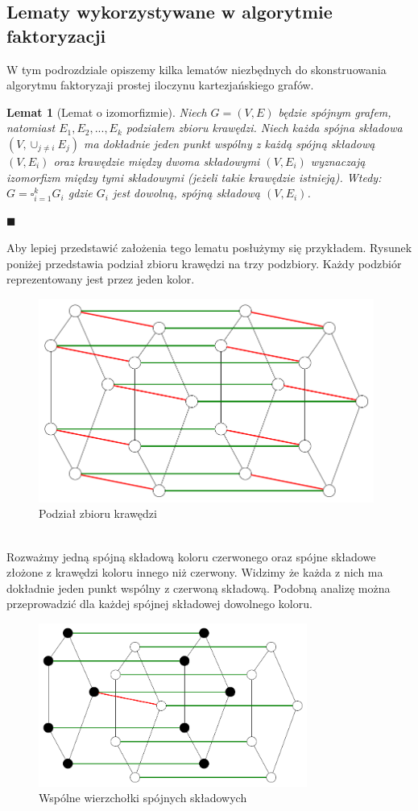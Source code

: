 \documentclass[12pt,a4paper,titlepage]{article}
\newtheorem{lem}[twr]{Lemat}
\newcommand\tab[1][1cm]{\hspace*{#1}}
\begin{document}
\subsection{Lematy wykorzystywane w algorytmie faktoryzacji}
W tym podrozdziale opiszemy kilka lematów niezbędnych do skonstruowania algorytmu faktoryzaji prostej iloczynu kartezjańskiego grafów.
\begin{lem}[Lemat o izomorfizmie]
Niech $G=(V, E)$ będzie spójnym grafem, natomiast $E_1 , E_2 , ... , E_k$ podziałem zbioru krawędzi. Niech każda spójna składowa $(V, \cup_{j \neq i}E_j)$ ma dokładnie jeden punkt wspólny z każdą spójną składową $(V, E_i)$ oraz krawędzie między dwoma składowymi $(V, E_i)$ wyznaczają izomorfizm między tymi składowymi (jeżeli takie krawędzie istnieją). Wtedy: $G=\square_{i=1}^k G_i $ gdzie $G_i $ jest dowolną, spójną składową $(V, E_i)$.
\end{lem}
\begin{flushright}
$\blacksquare$
\end{flushright}
\tab[0.6cm]Aby lepiej przedstawić założenia tego lematu posłużymy się przykładem. Rysunek poniżej przedstawia podział zbioru krawędzi na trzy podzbiory. Każdy podzbiór reprezentowany jest przez jeden kolor.
\begin{figure}[h]
\centering
\includegraphics[width = 11cm]{graf1.png}
\caption{Podział zbioru krawędzi}
\end{figure}
\\
\tab[0.6cm]Rozważmy jedną spójną składową koloru czerwonego oraz spójne składowe złożone z krawędzi koloru innego niż czerwony. Widzimy że każda z nich ma dokładnie jeden punkt wspólny z czerwoną składową. Podobną analizę można przeprowadzić dla każdej spójnej składowej dowolnego koloru.\\
\begin{figure}[h]
\centering
\includegraphics[width = 8.8cm]{izom1.png}
\caption{Wspólne wierzchołki spójnych składowych}
\end{figure}
\end{document}
